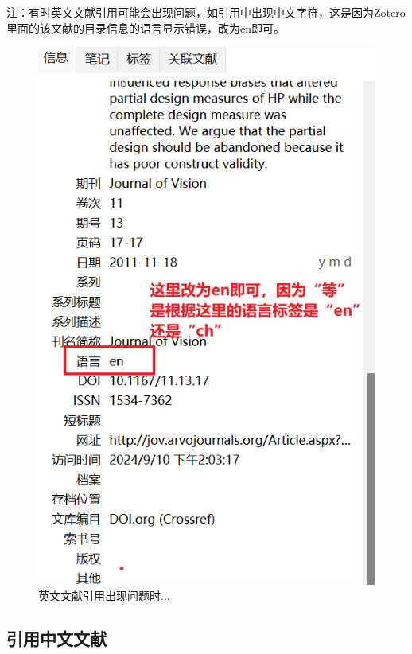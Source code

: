 \documentclass[]{ctexbook}
\theoremstyle{definition}
\theoremstyle{definition}
\theoremstyle{definition}
\theoremstyle{definition}
\theoremstyle{remark}
\begin{document}
注：有时英文文献引用可能会出现问题，如引用中出现中文字符，这是因为Zotero里面的该文献的目录信息的语言显示错误，改为en即可。

\begin{figure}

{\centering \includegraphics[width=1\linewidth]{img/zotero-cite-cn/ciation5} 

}

\caption{英文文献引用出现问题时...}\label{fig:English-ciation-problem}
\end{figure}

\subsection{引用中文文献}\label{ux5f15ux7528ux4e2dux6587ux6587ux732e}
\end{document}
